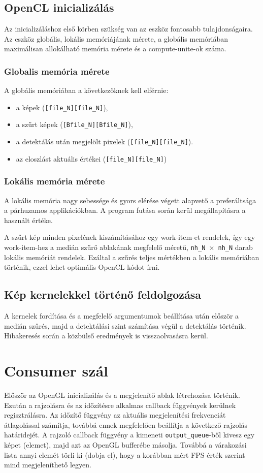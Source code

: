 	\subsection{OpenCL inicializálás}
	Az inicializáláshoz első körben szükség van az eszköz fontosabb tulajdonságaira. Az eszköz globális, lokális memóriájának mérete,
	a globális memóriában maximálisan allokálható memória mérete és a compute-unite-ok száma.
	\subsubsection{Globalis memória mérete}
	A globális memóriában a következőknek kell elférnie:
	\begin{itemize}[noitemsep]
	  \item a képek (\texttt{[file\_N][file\_N]}),
	  \item a szűrt képek (\texttt{[Bfile\_N][Bfile\_N]}),
	  \item a detektálás után megjelölt pixelek (\texttt{[file\_N][file\_N]}).
	  \item az eloszlást aktuális értékei (\texttt{[file\_N][file\_N]})
	\end{itemize}
	
	\subsubsection{Lokális memória mérete}
	A lokális memória nagy sebessége és gyors elérése végett alapvető a preferáltsága a párhuzamos applikációkban.
	A program futása során kerül megállapításra a használt értéke.
	
	A szűrt kép minden pixelének kiszámításához egy work-item-et rendelek, így egy work-item-hez a medián szűrő ablakának megfelelő
	méretű, \texttt{nh\_N $\times$ nh\_N} darab lokális memóriát rendelek. Ezáltal a szűrés teljes mértékben a lokális memóriában
	történik, ezzel lehet optimális OpenCL kódot írni.
	
	\subsection{Kép kernelekkel történő feldolgozása}
	A kernelek fordítása és a megfelelő argumentumok beállítása után először a medián szűrés, majd a detektálási szint számítása
	végül a detektálás történik. Hibakeresés során a közbülső eredmények is visszaolvasásra kerül.
	
	
\section{Consumer szál}
	Először az OpenGL inicializálás és a megjelenítő ablak létrehozása történik. 
	Ezután a rajzolásra és az időzítésre alkalmas callback függvények kerülnek regisztrálásra. Az időzítő függvény az aktuális
	megjelenítési frekvenciát átlagolással számítja, továbbá ennek megfelelően beállítja a következő rajzolás határidejét. A rajzoló
	callback függvény a kimeneti \texttt{output\_queue}-ből kivesz egy képet (elemet), majd azt az OpenGL bufferébe másolja. Továbbá
	a várakozási lista annyi elemét törli ki (dobja el), hogy a korábban mért FPS érték szerint mind megjeleníthető legyen.  
